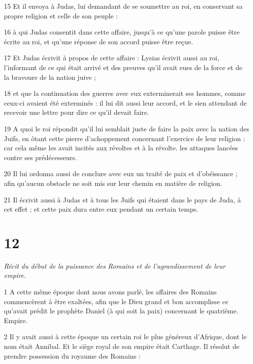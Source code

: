 \par 15 Et il envoya à Judas, lui demandant de se soumettre au roi, en conservant sa propre religion et celle de son peuple :

\par 16 à qui Judas consentit dans cette affaire, jusqu'à ce qu'une parole puisse être écrite au roi, et qu'une réponse de son accord puisse être reçue.

\par 17 Et Judas écrivit à propos de cette affaire : Lysias écrivit aussi au roi, l'informant de ce qui était arrivé et des preuves qu'il avait eues de la force et de la bravoure de la nation juive ;

\par 18 et que la continuation des guerres avec eux exterminerait ses hommes, comme ceux-ci avaient été exterminés : il lui dit aussi leur accord, et le sien attendant de recevoir une lettre pour dire ce qu'il devait faire.

\par 19 A quoi le roi répondit qu'il lui semblait juste de faire la paix avec la nation des Juifs, en ôtant cette pierre d'achoppement concernant l'exercice de leur religion : car cela même les avait incités aux révoltes et à la révolte. les attaques lancées contre ses prédécesseurs.

\par 20 Il lui ordonna aussi de conclure avec eux un traité de paix et d'obéissance ; afin qu'aucun obstacle ne soit mis sur leur chemin en matière de religion.

\par 21 Il écrivit aussi à Judas et à tous les Juifs qui étaient dans le pays de Juda, à cet effet ; et cette paix dura entre eux pendant un certain temps.


\chapter{12}

\par \textit{Récit du début de la puissance des Romains et de l'agrandissement de leur empire.}

\par 1 A cette même époque dont nous avons parlé, les affaires des Romains commencèrent à être exaltées, afin que le Dieu grand et bon accomplisse ce qu'avait prédit le prophète Daniel (à qui soit la paix) concernant le quatrième. Empire.

\par 2 Il y avait aussi à cette époque un certain roi le plus généreux d'Afrique, dont le nom était Annibal. Et le siège royal de son empire était Carthage. Il résolut de prendre possession du royaume des Romains :

